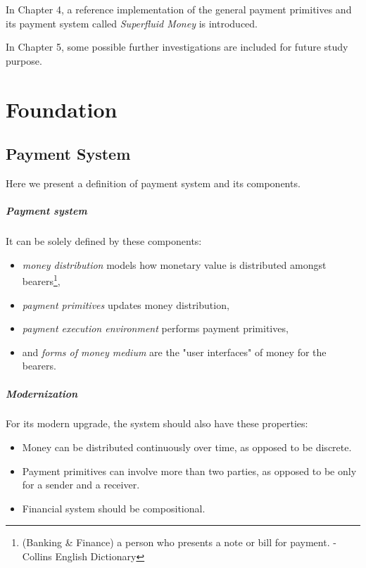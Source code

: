 In Chapter 4, a reference implementation of the general payment primitives and its payment system called
\textit{Superfluid Money} is introduced.

In Chapter 5, some possible further investigations are included for future study purpose.

\chapter{Foundation}

\section{Payment System}

Here we present a definition of payment system and its components.

\paragraph{Payment system}

It can be solely defined by these components:

\begin{itemize}
\item \textit{money distribution} models how monetary value is distributed amongst bearers\footnote{(Banking \& Finance)
a person who presents a note or bill for payment. - Collins English Dictionary},
\item \textit{payment primitives} updates money distribution,
\item \textit{payment execution environment} performs payment primitives,
\item and \textit{forms of money medium} are the "user interfaces" of money for the bearers.
\end{itemize}

\paragraph{Modernization}

For its modern upgrade, the system should also have these properties:

\begin{itemize}
\item Money can be distributed continuously over time, as opposed to be discrete.
\item Payment primitives can involve more than two parties, as opposed to be only for a sender and a receiver.
\item Financial system should be compositional.
\end{itemize}


